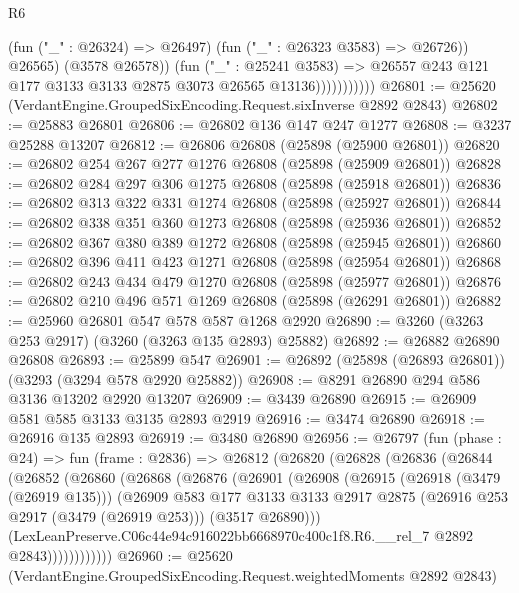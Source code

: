 \begin{lexlean}{R6}
\begin{coremodule}
                              (fun ("_" : @26324) => @26497)
                              (fun ("_" : @26323 @3583) => @26726))
                            @26565)
                          (@3578 @26578))
                        (fun ("_" : @25241 @3583) =>
                        @26557 @243 @121 @177 @3133 @3133 @2875 @3073 @26565 @13136)))))))))))
@26801 := @25620 (VerdantEngine.GroupedSixEncoding.Request.sixInverse @2892 @2843)
@26802 := @25883 @26801
@26806 := @26802 @136 @147 @247 @1277
@26808 := @3237 @25288 @13207
@26812 := @26806 @26808 (@25898 (@25900 @26801))
@26820 := @26802 @254 @267 @277 @1276 @26808 (@25898 (@25909 @26801))
@26828 := @26802 @284 @297 @306 @1275 @26808 (@25898 (@25918 @26801))
@26836 := @26802 @313 @322 @331 @1274 @26808 (@25898 (@25927 @26801))
@26844 := @26802 @338 @351 @360 @1273 @26808 (@25898 (@25936 @26801))
@26852 := @26802 @367 @380 @389 @1272 @26808 (@25898 (@25945 @26801))
@26860 := @26802 @396 @411 @423 @1271 @26808 (@25898 (@25954 @26801))
@26868 := @26802 @243 @434 @479 @1270 @26808 (@25898 (@25977 @26801))
@26876 := @26802 @210 @496 @571 @1269 @26808 (@25898 (@26291 @26801))
@26882 := @25960 @26801 @547 @578 @587 @1268 @2920
@26890 := @3260 (@3263 @253 @2917) (@3260 (@3263 @135 @2893) @25882)
@26892 := @26882 @26890 @26808
@26893 := @25899 @547
@26901 := @26892 (@25898 (@26893 @26801)) (@3293 (@3294 @578 @2920 @25882))
@26908 := @8291 @26890 @294 @586 @3136 @13202 @2920 @13207
@26909 := @3439 @26890
@26915 := @26909 @581 @585 @3133 @3135 @2893 @2919
@26916 := @3474 @26890
@26918 := @26916 @135 @2893
@26919 := @3480 @26890
@26956 := @26797
    (fun (phase : @24) =>
    fun (frame : @2836) =>
    @26812
      (@26820
        (@26828
          (@26836
            (@26844
              (@26852
                (@26860
                  (@26868
                    (@26876
                      (@26901
                        (@26908
                          (@26915
                            (@26918 (@3479 (@26919 @135)))
                            (@26909
                              @583
                              @177
                              @3133
                              @3133
                              @2917
                              @2875
                              (@26916 @253 @2917 (@3479 (@26919 @253)))
                              (@3517 @26890)))
                          (LexLeanPreserve.C06c44e94c916022bb6668970c400c1f8.R6.__rel_7
                            @2892
                            @2843))))))))))))
@26960 := @25620 (VerdantEngine.GroupedSixEncoding.Request.weightedMoments @2892 @2843)

\end{coremodule}
\end{lexlean}
